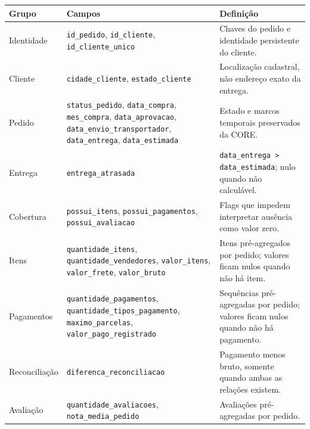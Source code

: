 \documentclass[12pt,a4paper]{article}
\newcounter{none}
\begin{document}
{\def\LTcaptype{none} %
\begin{longtable}[]{@{}
  >{\raggedright\arraybackslash}p{}
  >{\raggedright\arraybackslash}p{}
  >{\raggedright\arraybackslash}p{}@{}}
\toprule\noalign{}
\rowcolor{AzulCorporativo}
\begin{minipage}[b]{\linewidth}\raggedright\color{white}\bfseries
Grupo
\end{minipage} & \begin{minipage}[b]{\linewidth}\raggedright\color{white}\bfseries
Campos
\end{minipage} & \begin{minipage}[b]{\linewidth}\raggedright\color{white}\bfseries
Definição
\end{minipage} \\
\midrule\noalign{}
\endhead
\bottomrule\noalign{}
\endlastfoot
Identidade & \nolinkurl{id_pedido}, \nolinkurl{id_cliente},
\nolinkurl{id_cliente_unico} & Chaves do pedido e identidade persistente
do cliente. \\
Cliente & \nolinkurl{cidade_cliente}, \nolinkurl{estado_cliente} &
Localização cadastral, não endereço exato da entrega. \\
Pedido & \nolinkurl{status_pedido}, \nolinkurl{data_compra},
\nolinkurl{mes_compra}, \nolinkurl{data_aprovacao},
\nolinkurl{data_envio_transportador}, \nolinkurl{data_entrega},
\nolinkurl{data_estimada} & Estado e marcos temporais preservados da
CORE. \\
Entrega & \nolinkurl{entrega_atrasada} &
\nolinkurl{data_entrega > data_estimada}; nulo quando não calculável. \\
Cobertura & \nolinkurl{possui_itens}, \nolinkurl{possui_pagamentos},
\nolinkurl{possui_avaliacao} & Flags que impedem interpretar ausência
como valor zero. \\
Itens & \nolinkurl{quantidade_itens}, \nolinkurl{quantidade_vendedores},
\nolinkurl{valor_itens}, \nolinkurl{valor_frete},
\nolinkurl{valor_bruto} & Itens pré-agregados por pedido; valores ficam
nulos quando não há item. \\
Pagamentos & \nolinkurl{quantidade_pagamentos},
\nolinkurl{quantidade_tipos_pagamento}, \nolinkurl{maximo_parcelas},
\nolinkurl{valor_pago_registrado} & Sequências pré-agregadas por pedido;
valores ficam nulos quando não há pagamento. \\
Reconciliação & \nolinkurl{diferenca_reconciliacao} & Pagamento menos
bruto, somente quando ambas as relações existem. \\
Avaliação & \nolinkurl{quantidade_avaliacoes},
\nolinkurl{nota_media_pedido} & Avaliações pré-agregadas por pedido. \\
\end{longtable}
}
\end{document}
